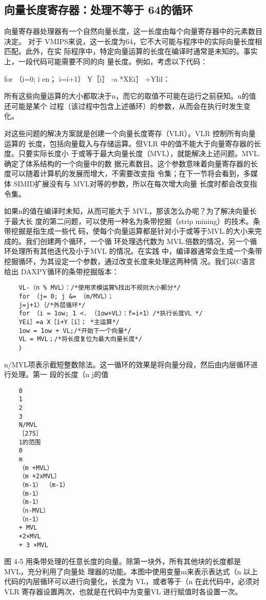 \subsection{向量长度寄存器：处理不等于 64的循环}

向量寄存器处理器有一个自然向量长度，这一长度由每个向量寄存器中的元素数目决定。
对于 VMIPS来说，这一长度为64，它不大可能与程序中的实际向量长度相匹配。此外，在实
际程序中，特定向量运算的长度在编译时通常是未知的。事实上，一段代码可能需要不同的向
量长度。例如，考虑以下代码：

for （i=0; i en；
i=i+1）
Y［i］ -a *XEi］ +YIil：

所有这些向量运算的大小都取决于n，而它的取值不可能在运行之前获知。n的值还可能是某个
过程（该过程中包含上述循环）的参数，从而会在执行时发生变化。

对这些问题的解决方案就是创建一个向量长度寄存（VLR）。VLR 控制所有向量运算的
长度，包括向量载入与存储运算。但VLR 中的值不能大于向量寄存器的长度。只要实际长度小
于或等于最大向量长度（MVL），就能解决上述问题。MVL.确定了体系结构的一个向量中的数
据元素数目。这个参数意味着向量寄存器的长度可以随着计算机的发展而增大，不需要改变指
令集；在下一节将会看到，多媒体 SIMID扩展没有与 MVL对等的参数，所以在每次增大向量
长度时都会改变指令集。

如果n的值在编译时未知，从而可能大于 MVL，那该怎么办呢？为了解决向量长于最大长
度的第二问题，可以使用一种名为条带挖掘（strip mining）的技术。条带挖掘是指生成一些代
码，使每个向量运算都是针对小于或等于MVL.的大小来完成的。我们创建两个循环，一个循
环处理选代数为 MVL.倍数的情况，另一个循环处理所有其他迭代及小于MVL 的情况。在实践
中，编译器通常会生成一个条带挖掘循环，为其设定一个参数，通过改变长度来处理这两种情
况。我们以C语言给出 DAXPY循环的条带挖掘版本：

\begin{verbatim}
    VL-（n % MVL）：/*使用求模运算%找出不规则大小郵分*/
    for （j= 0; j &= （m/MVL）；
    j=j+1）｛/*外层循环*/
    for （i = 1ow; 1 <. （1ow+VL）：f=i+1）/*执行长度VL */
    YEi］=a X［i+Y［i］； *主运算*/
    1ow = 1ow + VL;/*开始下一个向量*/
    VL = MVL；/*将长度复位为最大向量长度*/
    ｝
\end{verbatim}
n/MYL项表示截短整数除法。这一循环的效果是将向量分段，然后由内层循环进行处理。第一
段的长度（n %
j的值
\begin{verbatim}
    0
    1
    2
    3
    N/MVL
    ［275］
    1的范围
    0
    m
    （m +MVL）
    （m +2xMVL）
    （m-1） （m-1）
    （m-1）
    （m-1）
    （n-MVL）
    （n-1）
    + MVL
    +2×MVL
    + 3 ×MVL
\end{verbatim}
图 4-5 用条带处理的任意长度的向量。除第一块外，所有其他块的长度都是 MVL，充分利用了向量处
理器的功能。本图中使用变量m来表示表达式（n %
以上代码的内层循环可以进行向量化，长度为 VL，或者等于（n %
在此代码中，必须对VLR 寄存器设置两次，也就是在代码中为变量VL 进行赋值时各设置一次。

